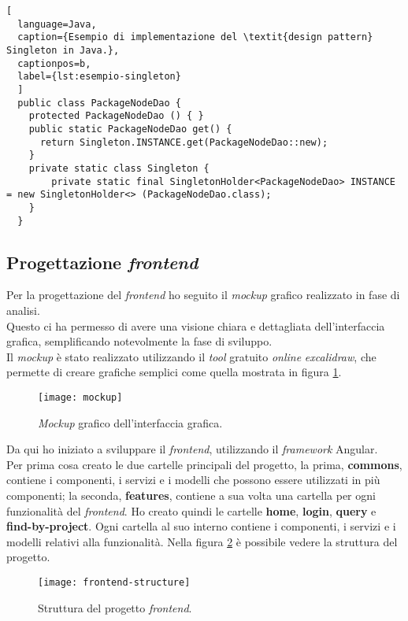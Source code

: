 \begin{lstlisting}[
  language=Java, 
  caption={Esempio di implementazione del \textit{design pattern} Singleton in Java.},
  captionpos=b, 
  label={lst:esempio-singleton}
  ]
  public class PackageNodeDao {
    protected PackageNodeDao () { }
    public static PackageNodeDao get() {
      return Singleton.INSTANCE.get(PackageNodeDao::new);
    }
    private static class Singleton {
        private static final SingletonHolder<PackageNodeDao> INSTANCE = new SingletonHolder<> (PackageNodeDao.class);
    }
  }
\end{lstlisting}

\subsection*{Progettazione \textit{frontend}}

Per la progettazione del \textit{frontend} ho seguito il \textit{mockup} grafico realizzato in fase di analisi.\\
Questo ci ha permesso di avere una visione chiara e dettagliata dell'interfaccia grafica, 
semplificando notevolmente la fase di sviluppo.\\
Il \textit{mockup} è stato realizzato utilizzando il \textit{tool} gratuito \textit{online} \textit{excalidraw}, che permette di creare grafiche semplici
come quella mostrata in figura \ref*{fig:mockup}.\\
\begin{figure}[!h] 
  \centering 
  \texttt{[image: mockup]} 
  \caption{\textit{Mockup} grafico dell'interfaccia grafica.}
  \label{fig:mockup}
\end{figure}

Da qui ho iniziato a sviluppare il \textit{frontend}, utilizzando il \textit{framework} Angular.\\
Per prima cosa creato le due cartelle principali del progetto, la prima, \textbf{commons}, contiene i componenti, i servizi e i modelli che possono 
essere utilizzati in più componenti;
la seconda, \textbf{features}, contiene a sua volta una cartella per ogni funzionalità del \textit{frontend}.
Ho creato quindi le cartelle \textbf{home}, \textbf{login}, \textbf{query} e \textbf{find-by-project}. 
  Ogni cartella al suo interno contiene i componenti, i servizi e i modelli relativi alla funzionalità. 
  Nella figura \ref*{fig:frontend-structure} è possibile vedere la struttura del progetto.
  \begin{figure}[!h] 
    \centering
    \texttt{[image: frontend-structure]} 
    \caption{Struttura del progetto \textit{frontend}.}
    \label{fig:frontend-structure}
  \end{figure}  

